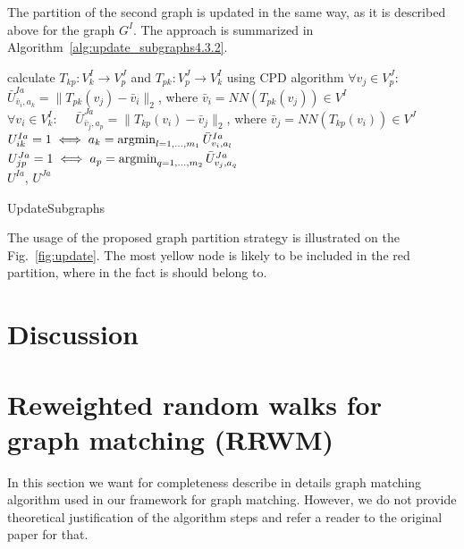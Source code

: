 The partition of the second graph is updated in the same way, as it is described above for the graph $G^I$. The approach is summarized in Algorithm~\ref{alg:update_subgraphs4.3.2}.

\begin{algorithm}[h]
	{
		calculate $T_{kp}:V^I_k\rightarrow V^J_p$ and $T_{pk}:V^J_p\rightarrow V^I_k$ using CPD algorithm
	}
	{
		$\forall v_j\in V^J_p:\quad$ $\bar{U}^{Ia}_{\bar{v}_i,a_k}=\|T_{pk}(v_j)-\bar{v}_i\|_2$, where $\bar{v}_i=NN(T_{pk}(v_j))\in V^I$\\
		$\forall v_i\in V^I_k:\quad$ $\bar{U}^{Ja}_{\bar{v}_j,a_p}=\|T_{kp}(v_i)-\bar{v}_j\|_2$, where $\bar{v}_j=NN(T_{kp}(v_i))\in V^J$
	}
	$U^{Ia}_{ik}=1 \iff a_k=\mathop{\rm argmin}_{l=1,\dots,m_1}^{}{\bar{U}^{Ia}_{v_i,a_l}}$\\
	$U^{Ja}_{jp}=1 \iff a_p=\mathop{\rm argmin}_{q=1,\dots,m_2}^{}{\bar{U}^{Ja}_{v_j,a_q}}$\\
	\Return $U^{Ia}$, $U^{Ja}$
	
	\caption{UpdateSubgraphs}    \label{alg:update_subgraphs4.3.2}
\end{algorithm}

The usage of the proposed graph partition strategy is illustrated on the Fig.~\ref{fig:update}. The most yellow node is likely to be included in the red partition, where in the fact is should belong to.
\FloatBarrier

\section{Discussion}


\section{Reweighted random walks for graph matching (RRWM)}
In this section we want for completeness describe in details graph matching algorithm used in our framework for graph matching. However, we do not provide theoretical justification of the algorithm steps and refer a reader to the original paper for that. %


